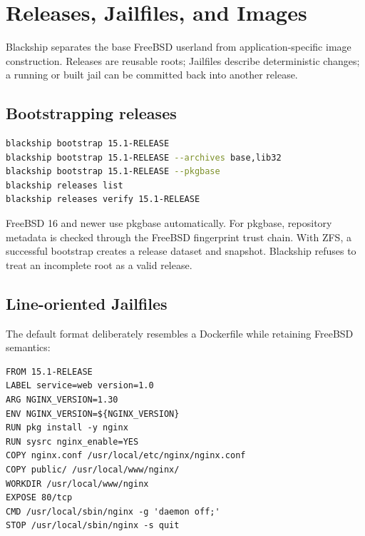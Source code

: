 \chapter{Releases, Jailfiles, and Images}
\label{ch:images}

Blackship separates the base FreeBSD userland from application-specific image
construction. Releases are reusable roots; Jailfiles describe deterministic
changes; a running or built jail can be committed back into another release.

\section{Bootstrapping releases}

\begin{lstlisting}[language=bash]
blackship bootstrap 15.1-RELEASE
blackship bootstrap 15.1-RELEASE --archives base,lib32
blackship bootstrap 15.1-RELEASE --pkgbase
blackship releases list
blackship releases verify 15.1-RELEASE
\end{lstlisting}

FreeBSD 16 and newer use pkgbase automatically. For pkgbase, repository
metadata is checked through the FreeBSD fingerprint trust chain. With ZFS, a
successful bootstrap creates a release dataset and 
snapshot. Blackship refuses to treat an incomplete root as a valid release.

\section{Line-oriented Jailfiles}

The default format deliberately resembles a Dockerfile while retaining
FreeBSD semantics:

\begin{lstlisting}[language=Jailfile]
FROM 15.1-RELEASE
LABEL service=web version=1.0
ARG NGINX_VERSION=1.30
ENV NGINX_VERSION=${NGINX_VERSION}
RUN pkg install -y nginx
RUN sysrc nginx_enable=YES
COPY nginx.conf /usr/local/etc/nginx/nginx.conf
COPY public/ /usr/local/www/nginx/
WORKDIR /usr/local/www/nginx
EXPOSE 80/tcp
CMD /usr/local/sbin/nginx -g 'daemon off;'
STOP /usr/local/sbin/nginx -s quit
\end{lstlisting}

